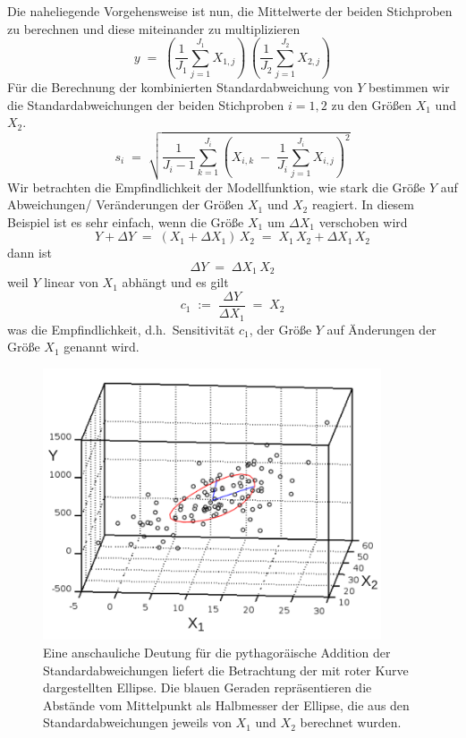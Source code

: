 Die naheliegende Vorgehensweise ist nun, die Mittelwerte der beiden Stichproben zu berechnen und
diese miteinander zu multiplizieren
\begin{equation}
y \; = \; \left(\frac{1}{J_1} \sum_{j=1}^{J_1} X_{1,j}\right) \,
          \left(\frac{1}{J_2} \sum_{j=1}^{J_2} X_{2,j}\right)
\end{equation}
Für die Berechnung der kombinierten Standardabweichung von $Y$ bestimmen wir
die Standardabweichungen der beiden Stichproben $i = 1,2$ zu den Größen $X_1$ und $X_2$.
\begin{equation}
s_i \; = \; \sqrt{ \frac{1}{J_i - 1} \sum_{k=1}^{J_i}
 \left( X_{i,k} \; - \; \frac{1}{J_i} \sum_{j=1}^{J_i} X_{i,j}\right)^2 }
\end{equation}
Wir betrachten die Empfindlichkeit der Modellfunktion, wie stark die Größe $Y$ auf
Abweichungen/ Veränderungen der Größen $X_1$ und $X_2$ reagiert.
In diesem Beispiel ist es sehr einfach, wenn die Größe $X_1$ um $\Delta X_1$ verschoben wird
\begin{equation}
Y + \Delta Y \; = \; (X_1 + \Delta X_1) \, X_2 \; = \; X_1\, X_2 + \Delta X_1 \, X_2
\end{equation}
dann ist
\begin{equation}
\Delta Y \; = \; \Delta X_1 \, X_2
\end{equation}
weil $Y$ linear von $X_1$ abhängt und es gilt
\begin{equation}
c_1 \; := \; \frac{\Delta Y}{\Delta X_1} \; = \; X_2
\end{equation}
was die Empfindlichkeit, d.h.\ Sensitivität $c_1$, der Größe $Y$ auf Änderungen der Größe
$X_1$ genannt wird.
\begin{figure}
\begin{center}
\includegraphics[width=100mm]{07_vorlesung/media/understand_fehlerfort_1.pdf}
\caption{\label{FortpfElliptisch} Eine anschauliche Deutung für die pythagoräische
Addition der Standardabweichungen liefert die Betrachtung der mit roter Kurve dargestellten
Ellipse. Die blauen Geraden repräsentieren die Abstände vom Mittelpunkt als Halbmesser
der Ellipse, die aus den Standardabweichungen jeweils von $X_1$ und $X_2$ berechnet wurden.}
\end{center}
\end{figure}
